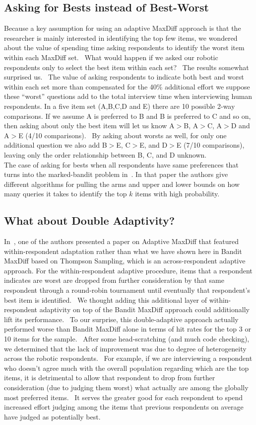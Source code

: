 \documentclass[nonblindrev]{informs3}
\begin{document}
\subsection{Asking for Bests instead of Best-Worst}
Because a key assumption for using an adaptive MaxDiff approach is that the researcher is mainly interested in identifying the top few items, we wondered about the value of spending time asking respondents to identify the worst item within each MaxDiff set.  What would happen if we asked our robotic respondents only to select the best item within each set?  The results somewhat surprised us.  The value of asking respondents to indicate both best and worst within each set more than compensated for the 40\% additional effort we suppose these ``worst'' questions add to the total interview time when interviewing human respondents.
In a five item set (A,B,C,D and E) there are 10 possible 2-way comparisons. If we assume A is preferred to B and B is preferred to C and so on, then asking about only the best item will let us know A$>$B, A$>$C, A$>$D and A$>$E (4/10 comparisons).  By asking about worsts as well, for only one additional question we also add B$>$E, C$>$E, and D$>$E (7/10 comparisons), leaving only the order relationship between B, C, and D unknown.\\ 
The case of asking for bests when all respondents have same preferences that turns into the marked-bandit problem in~\cite{simchowitz2016best}. In that paper the authors give different algorithms for pulling the arms and upper and lower bounds on how many queries it takes to identify the top $k$ items with high probability. 
\subsection{What about Double Adaptivity?}
In~\cite{orme2006adaptive}, one of the authors presented a paper on Adaptive MaxDiff that featured within-respondent adaptation rather than what we have shown here in Bandit MaxDiff based on Thompson Sampling, which is an across-respondent adaptive approach. For the within-respondent adaptive procedure, items that a respondent indicates are worst are dropped from further consideration by that same respondent through a round-robin tournament until eventually that respondent's best item is identified.  We thought adding this additional layer of within-respondent adaptivity on top of the Bandit MaxDiff approach could additionally lift its performance.  To our surprise, this double-adaptive approach actually performed worse than Bandit MaxDiff alone in terms of hit rates for the top 3 or 10 items for the sample.  After some head-scratching (and much code checking), we determined that the lack of improvement was due to degree of heterogeneity across the robotic respondents.  For example, if we are interviewing a respondent who doesn't agree much with the overall population regarding which are the top items, it is detrimental to allow that respondent to drop from further consideration (due to judging them worst) what actually are among the globally most preferred items.  It serves the greater good for each respondent to spend increased effort judging among the items that previous respondents on average have judged as potentially best.
\end{document}
